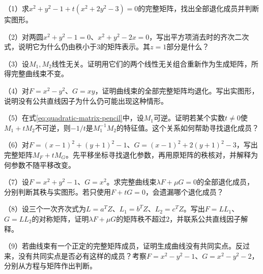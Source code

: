 \begin{exercise}
\mbox{}\par\nobreak

\begin{samepage}
（1）求\(x^2+y^2-1+t(x^2+2y^2-3)=0\)的完整矩阵，找出全部退化成员并判断实图形。
\par
\end{samepage}

\begin{samepage}
（2）对两圆\(x^2+y^2-1=0\)、\(x^2+y^2-2x=0\)，写出平方项消去时的齐次二次式，说明它为什么仍由秩小于\(3\)的矩阵表示。其\(z=1\)部分是什么？
\par
\end{samepage}

\begin{samepage}
（3）设\(M_1,M_2\)线性无关。证明用它们的两个线性无关组合重新作为生成矩阵，所得完整曲线束不变。
\par
\end{samepage}

\begin{samepage}
（4）对\(F=x^2-y^2\)、\(G=xy\)，证明曲线束的全部完整矩阵均退化。写出实图形，说明没有公共直线因子为什么仍可能出现这种情形。
\par
\end{samepage}

\begin{samepage}
（5）在式\eqref{eq:quadratic-matrix-pencil}中，设\(M_1\)可逆。证明若某个实数\(t\ne0\)使\(M_1+tM_2\)不可逆，则\(-1/t\)是\(M_1^{-1}M_2\)的特征值。这个关系如何帮助寻找退化成员？
\par
\end{samepage}

\begin{samepage}
（6）对\(F=(x-1)^2+(y+1)^2-1\)、\(G=(x-1)^2+2(y+1)^2-3\)，写出完整矩阵\(M_F+tM_G\)。先平移坐标寻找退化参数，再用原矩阵的秩核对，并解释为何参数不随平移改变。
\par
\end{samepage}

\begin{samepage}
（7）设\(F=x^2+y^2-1\)、\(G=x^2\)。求完整曲线束\(\lambda F+\mu G=0\)的全部退化成员，分别判断其秩与实图形。若只使用\(F+tG=0\)，会遗漏哪个退化成员？
\par
\end{samepage}

\begin{samepage}
（8）设三个一次齐次式为\(L=a^TZ\)、\(L_1=b^TZ\)、\(L_2=c^TZ\)。写出\(F=LL_1\)、\(G=LL_2\)的对称矩阵，证明\(\lambda F+\mu G\)的矩阵秩不超过\(2\)，并联系公共直线因子解释。
\par
\end{samepage}

\begin{samepage}
（9）若曲线束有一个正定的完整矩阵成员，证明生成曲线没有共同实点。反过来，没有共同实点是否必有这样的成员？考察\(F=x^2-y^2-1\)、\(G=x^2-y^2-2\)，分别从方程与矩阵作出判断。
\par
\end{samepage}

\end{exercise}
